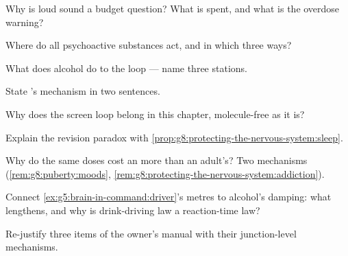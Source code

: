 \begin{exercise}[$\star$]\label{exo:g8:protecting-the-nervous-system:2}
Why is loud sound a budget question? What is spent, and
what is the overdose warning?
\end{exercise}

\begin{exercise}[$\star$]\label{exo:g8:protecting-the-nervous-system:3}
Where do all psychoactive substances act, and in which
three ways?
\end{exercise}

\begin{exercise}[$\star$]\label{exo:g8:protecting-the-nervous-system:4}
What does alcohol do to the loop --- name three
stations.
\end{exercise}

\begin{exercise}[$\star$]\label{exo:g8:protecting-the-nervous-system:5}
State 's mechanism in two sentences.
\end{exercise}

\begin{exercise}[$\star$]\label{exo:g8:protecting-the-nervous-system:6}
Why does the screen loop belong in this chapter,
molecule-free as it is?
\end{exercise}

\begin{exercise}[$\star\star$]\label{exo:g8:protecting-the-nervous-system:7}
Explain the revision paradox with
\cref{prop:g8:protecting-the-nervous-system:sleep}.
\end{exercise}

\begin{exercise}[$\star\star$]\label{exo:g8:protecting-the-nervous-system:8}
Why do the same doses cost an   more than
an adult's? Two mechanisms
(\cref{rem:g8:puberty:moods},
\cref{rem:g8:protecting-the-nervous-system:addiction}).
\end{exercise}

\begin{exercise}[$\star\star$]\label{exo:g8:protecting-the-nervous-system:9}
Connect \cref{ex:g5:brain-in-command:driver}'s metres to
alcohol's damping: what lengthens, and why is
drink-driving law a reaction-time law?
\end{exercise}

\begin{exercise}[$\star\star$]\label{exo:g8:protecting-the-nervous-system:10}
Re-justify three items of the owner's manual with their
junction-level mechanisms.
\end{exercise}

